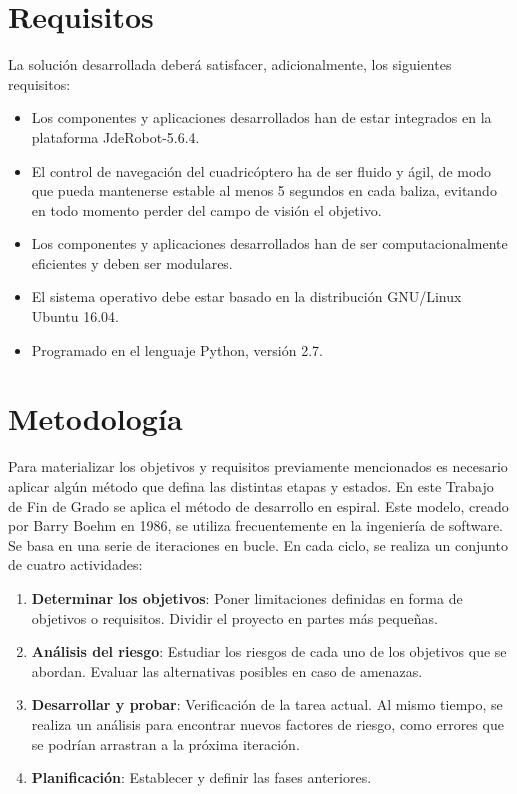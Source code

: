 \section{Requisitos}
\label{sec:requisitos}

La solución desarrollada deberá satisfacer, adicionalmente, los siguientes requisitos:

\begin{itemize}
	
	\item Los componentes y aplicaciones desarrollados han de estar integrados en la plataforma JdeRobot-5.6.4.
	
	\item El control de navegación del cuadricóptero ha de ser fluido y ágil, de modo que pueda mantenerse estable al menos 5 segundos en cada baliza, evitando en todo momento perder del campo de visión el objetivo.
	
	\item Los componentes y aplicaciones desarrollados han de ser computacionalmente eficientes y deben ser modulares.
	
	\item El sistema operativo debe estar basado en la distribución GNU/Linux Ubuntu 16.04.
	
	\item Programado en el lenguaje Python, versión 2.7.
	
\end{itemize}

\section{Metodología}

Para materializar los objetivos y requisitos previamente mencionados es necesario aplicar algún método que defina las distintas etapas y estados. En este Trabajo de Fin de Grado se aplica el método de desarrollo en espiral. Este modelo, creado por Barry Boehm en 1986, se utiliza frecuentemente en la ingeniería de software. Se basa en una serie de iteraciones en bucle. En cada ciclo, se realiza un conjunto de cuatro actividades:

\begin{enumerate}
	\item \textbf{Determinar los objetivos}: Poner limitaciones definidas en forma de objetivos o requisitos. Dividir el proyecto en partes más pequeñas.
	\item \textbf{Análisis del riesgo}: Estudiar los riesgos de cada uno de los objetivos que se abordan. Evaluar las alternativas posibles en caso de amenazas.
	\item \textbf{Desarrollar y probar}: Verificación de la tarea actual. Al mismo tiempo, se realiza un análisis para encontrar nuevos factores de riesgo, como errores que se podrían arrastran a la próxima iteración.
	\item \textbf{Planificación}: Establecer y definir las fases anteriores.
\end{enumerate}

